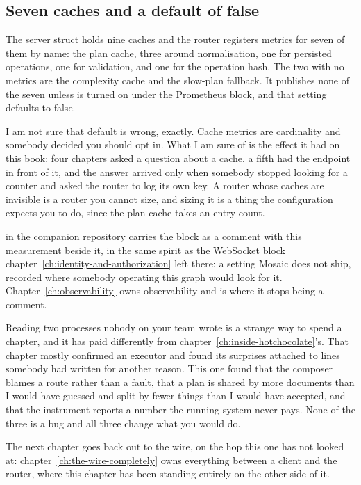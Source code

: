 \subsection*{Seven caches and a default of false}

%
The server struct holds nine caches and the router registers metrics for seven
of them by name: the plan cache, three around normalisation, one for persisted
operations, one for validation, and one for the operation hash. The two with no
metrics are the complexity cache and the slow-plan fallback. It publishes none
of the seven unless  is turned on under the Prometheus
block, and that setting defaults to false.

I am not sure that default is wrong, exactly. Cache metrics are cardinality and
somebody decided you should opt in. What I am sure of is the effect it had on
this book: four chapters asked a question about a cache, a fifth had the
endpoint in front of it, and the answer arrived only when somebody stopped
looking for a counter and asked the router to log its own key. A router whose
caches are invisible is a router you cannot size, and sizing it is a thing the
configuration expects you to do, since the plan cache takes an entry count.

 in the companion repository carries the block as a
comment with this measurement beside it, in the same spirit as the WebSocket
block chapter~\ref{ch:identity-and-authorization} left there: a setting Mosaic
does not ship, recorded where somebody operating this graph would look for it.
Chapter~\ref{ch:observability} owns observability and is where it stops being a
comment.

\medskip
{}%
Reading two processes nobody on your team wrote is a strange way to spend a
chapter, and it has paid differently from
chapter~\ref{ch:inside-hotchocolate}'s. That chapter mostly confirmed an
executor and found its surprises attached to lines somebody had written for
another reason. This one found that the composer blames a route rather than a
fault, that a plan is shared by more documents than I would have guessed and
split by fewer things than I would have accepted, and that the instrument
reports a number the running system never pays. None of the three is a bug and
all three change what you would do.

The next chapter goes back out to the wire, on the hop this one has not looked
at: chapter~\ref{ch:the-wire-completely} owns everything between a client and
the router, where this chapter has been standing entirely on the other side of
it.

%
